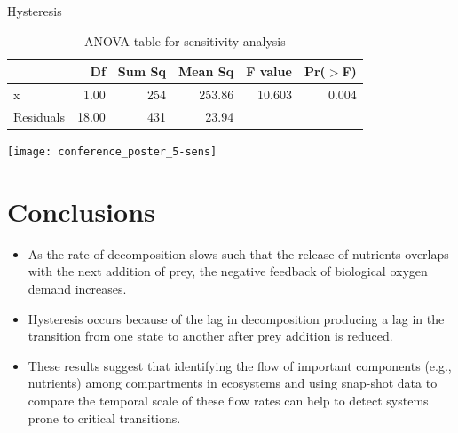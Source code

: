 \documentclass[a0,landscape]{a0poster}
\begin{document}
\begin{multicols}{4}
\begin{block}{Hysteresis}
\end{block}

\begin{block}
  
\begin{Schunk}
\begin{Soutput}
\begin{table}[ht]
\centering
\begin{tabular}{lrrrrr}
  \hline
 & Df & Sum Sq & Mean Sq & F value & Pr($>$F) \\ 
  \hline
x           & 1.00 & 254 & 253.86 & 10.603 & 0.004 \\ 
  Residuals   & 18.00 & 431 & 23.94 &  &  \\ 
   \hline
\end{tabular}
\caption{ANOVA table for sensitivity analysis} 
\label{tab:one}
\end{table}
\end{Soutput}
\end{Schunk}
\texttt{[image: conference\_poster\_5-sens]}

\end{block}


\color{SaddleBrown} %

\section*{Conclusions}

\begin{itemize}
\item As the rate of decomposition slows such that the release of
  nutrients overlaps with the next addition of prey, the negative
  feedback of biological oxygen demand increases. 
\item Hysteresis occurs because of the lag in decomposition producing
  a lag in the transition from one state to another after prey
  addition is reduced.
\item These results suggest that identifying the flow of important
  components (e.g., nutrients) among compartments in ecosystems and
  using snap-shot data to compare the temporal scale of these flow
  rates can help to detect systems prone to critical transitions.
\end{itemize}


\end{multicols}
\end{document}
